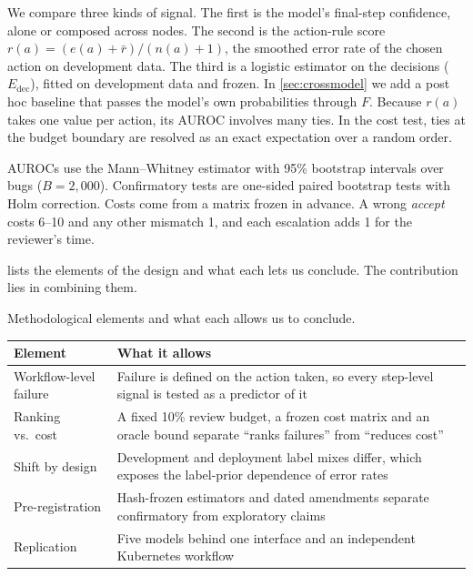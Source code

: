  We compare three kinds of signal. The first
is the model's final-step confidence, alone or composed across nodes. The
second is the action-rule score $r(a) = (e(a) + \bar r)/(n(a) + 1)$, the
smoothed error rate of the chosen action on development data. The third
is a logistic estimator on the decisions ($E_{\text{dec}}$), fitted on
development data and frozen. In
\cref{sec:crossmodel} we add a post hoc baseline that passes the model's
own probabilities through $F$. Because $r(a)$ takes one value per action,
its AUROC involves many ties. In the cost test, ties at the budget
boundary are resolved as an exact expectation over a random order.

 AUROCs use the Mann--Whitney estimator with 95\%
bootstrap intervals over bugs ($B = 2{,}000$). Confirmatory tests are
one-sided paired bootstrap tests with Holm correction. Costs come from a matrix frozen in advance. A wrong \emph{accept}
costs 6--10 and any other mismatch 1, and each escalation adds 1 for the
reviewer's time.

  lists the elements of the design and
what each lets us conclude. The contribution lies in combining them.

\begin{coltable}
\centering
\caption{Methodological elements and what each allows us to conclude.}
\label{tab:novelty}
\footnotesize
\begin{tabularx}{\linewidth}{>{\raggedright\arraybackslash}p{2.2cm} Y}
\toprule
Element & What it allows \\
\midrule
Workflow-level failure & Failure is defined on the action taken, so every step-level signal is tested as a predictor of it \\ \addlinespace
Ranking vs.\ cost & A fixed 10\% review budget, a frozen cost matrix and an oracle bound separate ``ranks failures'' from ``reduces cost'' \\ \addlinespace
Shift by design & Development and deployment label mixes differ, which exposes the label-prior dependence of error rates \\ \addlinespace
Pre-registration & Hash-frozen estimators and dated amendments separate confirmatory from exploratory claims \\ \addlinespace
Replication & Five models behind one interface and an independent Kubernetes workflow \\
\bottomrule
\end{tabularx}
\end{coltable}

